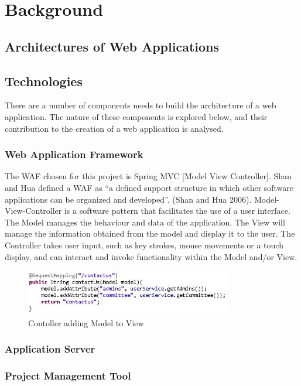 \chapter{Background}
\label{background}

\section{Architectures of Web Applications}

\section{Technologies}

There are a number of components needs to build the architecture of a web application. The nature of these components is explored below, and their contribution to the creation of a web application is analysed.

\subsection{Web Application Framework}
The WAF chosen for this project is Spring MVC [Model View Controller]. Shan and Hua defined a WAF as “a defined support structure in which other software applications can be organized and developed”. (Shan and Hua 2006). Model-View-Controller is a software pattern that facilitates the use of a user interface. The Model manages the behaviour and data of the application. The View will manage the information obtained from the model and display it to the user. The Controller takes user input, such as key strokes, mouse movements or a touch display, and can interact and invoke functionality within the Model and/or View.

\begin{figure}[ht!]
\centering
\includegraphics[width=90mm]{figs/fig3-4-1.jpg}
\caption{Contoller adding Model to View}
\label{overflow}
\end{figure}


\subsection{Application Server}

\subsection{Project Management Tool}

